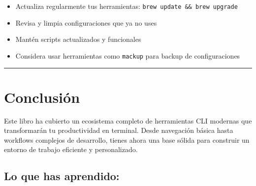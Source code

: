 \documentclass[
  11pt,
  letterpaper,
  oneside,
  openany]{scrbook}
\providecommand{\tightlist}{%
  \setlength{\itemsep}{0pt}\setlength{\parskip}{0pt}}
\begin{document}
\begin{tcolorbox}[enhanced jigsaw, coltitle=black, breakable, arc=.35mm, toprule=.15mm, colbacktitle=quarto-callout-important-color!10!white, colframe=quarto-callout-important-color-frame, opacityback=0, colback=white, bottomtitle=1mm, bottomrule=.15mm, rightrule=.15mm, left=2mm, toptitle=1mm, leftrule=.75mm, title=\textcolor{quarto-callout-important-color}{\faExclamation}\hspace{0.5em}{Mantenimiento del entorno}, titlerule=0mm, opacitybacktitle=0.6]

\begin{itemize}
\tightlist
\item
  Actualiza regularmente tus herramientas:
  \texttt{brew\ update\ \&\&\ brew\ upgrade}
\item
  Revisa y limpia configuraciones que ya no uses
\item
  Mantén scripts actualizados y funcionales
\item
  Considera usar herramientas como \texttt{mackup} para backup de
  configuraciones
\end{itemize}

\end{tcolorbox}

\begin{center}\rule{0.5\linewidth}{0.5pt}\end{center}

\section{Conclusión}\label{conclusiuxf3n}

Este libro ha cubierto un ecosistema completo de herramientas CLI
modernas que transformarán tu productividad en terminal. Desde
navegación básica hasta workflows complejos de desarrollo, tienes ahora
una base sólida para construir un entorno de trabajo eficiente y
personalizado.

\subsection{Lo que has aprendido:}\label{lo-que-has-aprendido}
\end{document}
